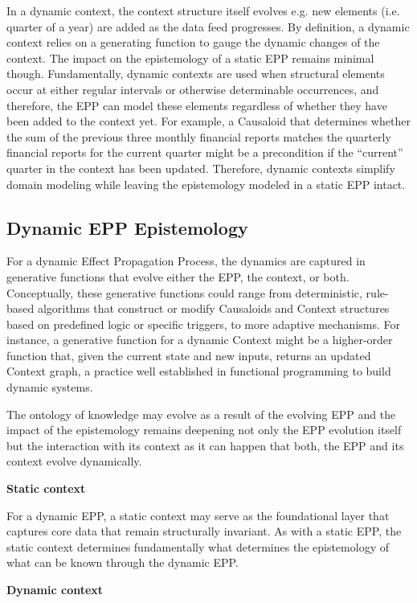 \documentclass{article}
\begin{document}
In a dynamic context, the context structure itself evolves e.g. new elements (i.e. quarter of a year) are added as the data feed progresses. By definition, a dynamic context relies on a generating function to gauge the dynamic changes of the context. The impact on the epistemology of a static EPP remains minimal though.
Fundamentally, dynamic contexts are used when structural elements occur at either regular intervals or otherwise determinable occurrences, and therefore, the EPP can model these elements regardless of whether they have been added to the context yet.
For example, a Causaloid that determines whether the sum of the previous three monthly financial reports matches the quarterly financial reports for the current quarter might be a precondition if the “current” quarter in the context has been updated. Therefore, dynamic contexts simplify domain modeling while leaving the epistemology modeled in a static EPP intact.

\subsection{Dynamic EPP Epistemology}

For a dynamic Effect Propagation Process, the dynamics are captured in generative functions that evolve either the EPP, the context, or both. Conceptually, these generative functions could range from deterministic, rule-based algorithms that construct or modify Causaloids and Context structures based on predefined logic or specific triggers, to more adaptive mechanisms. For instance, a generative function for a dynamic Context might be a higher-order function that, given the current state and new inputs, returns an updated Context graph, a practice well established in functional programming to build dynamic systems.

The ontology of knowledge may evolve as a result of the evolving EPP and the impact of the epistemology remains deepening not only the EPP evolution itself but the interaction with its context as it can happen that both, the EPP and its context evolve dynamically.

\textbf{Static context}

For a dynamic EPP, a static context may serve as the foundational layer that captures core data that remain structurally invariant. As with a static EPP, the static context determines fundamentally what determines the epistemology of what can be known through the dynamic EPP.

\textbf{Dynamic context}
\end{document}
